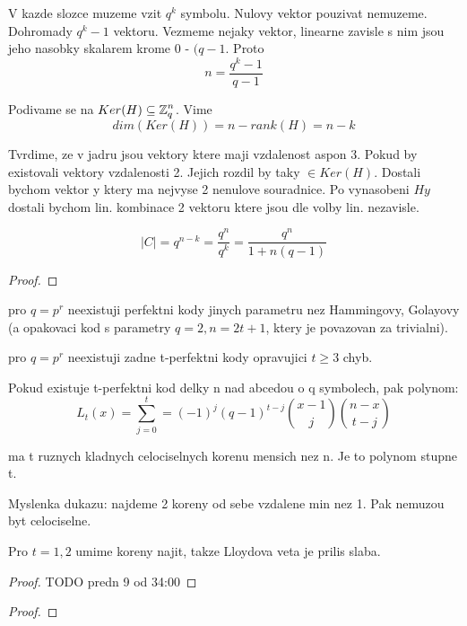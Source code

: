 	V kazde slozce muzeme vzit $q^k$ symbolu. Nulovy vektor pouzivat nemuzeme. Dohromady $q^k - 1$ vektoru. Vezmeme nejaky vektor, linearne zavisle s nim jsou jeho nasobky skalarem krome 0 - $(q - 1$. Proto
	\[ n = \frac{q^k - 1}{q - 1} \]

	Podivame se na $Ker(H) \subseteq \operatorname{\mathbb{Z}}_q^n$. Vime
	\[ dim(Ker(H)) = n - rank(H) = n - k \]

	Tvrdime, ze v jadru jsou vektory ktere maji vzdalenost aspon 3. Pokud by existovali vektory vzdalenosti 2. Jejich rozdil by taky $\in Ker(H)$.
	Dostali bychom vektor y ktery ma nejvyse 2 nenulove souradnice. Po vynasobeni $Hy$ dostali bychom lin. kombinace 2 vektoru ktere jsou dle volby lin. nezavisle.

	\[ |C| = q^{n - k} = \frac{q^n}{q^k} = \frac{q^n}{1 + n(q-1)} \]
\begin{proof}
\end{proof}

\begin{theorem}
	pro $q = p^r$ neexistuji perfektni kody jinych parametru nez Hammingovy, Golayovy (a opakovaci kod s parametry $q = 2, n = 2t + 1$, ktery je povazovan za trivialni).
\end{theorem}

\begin{theorem}
	pro $q = p^r$ neexistuji zadne t-perfektni kody opravujici $t \geq 3$ chyb.
\end{theorem}

\begin{theorem}[Lloyd]
	Pokud existuje t-perfektni kod delky n nad abcedou o q symbolech, pak polynom:
	\[ L_t(x) = \sum_{j = 0}^t = (-1)^j(q - 1)^{t - j} \binom{x - 1}{j} \binom{n - x}{t - j} \]

	ma t ruznych kladnych celociselnych korenu mensich nez n. Je to polynom stupne t.

	Myslenka dukazu: najdeme 2 koreny od sebe vzdalene min nez 1. Pak nemuzou byt celociselne.

	Pro $t = 1,2$ umime koreny najit, takze Lloydova veta je prilis slaba.
\end{theorem}
\begin{proof}
	TODO predn 9 od 34:00
\end{proof}

\begin{lemma}
\end{lemma}
\begin{proof}
\end{proof}
